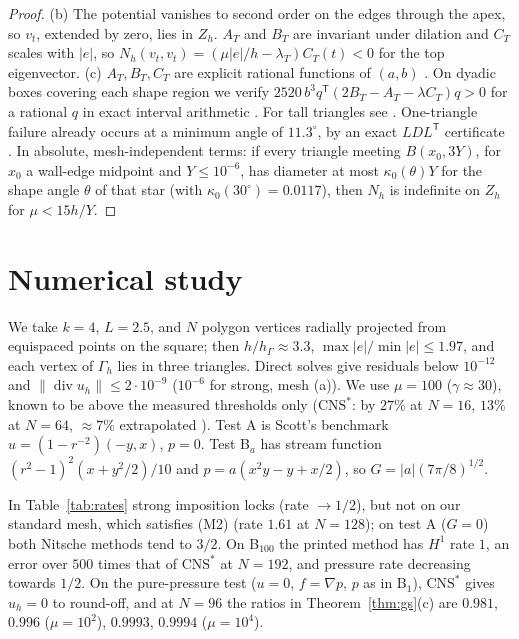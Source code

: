\documentclass[5p,times]{elsarticle}
\theoremstyle{definition}
\newcommand{\hG}{h_\Gamma}
\newcommand{\Gh}{\Gamma_h}
\newcommand{\Zh}{Z_h}
\newcommand{\norm}[1]{\lVert #1\rVert}
\newcommand{\CNS}{\mathrm{CNS}^\ast}
\renewcommand{\div}{\operatorname{div}}
\newcommand{\ext}[1]{\cite[#1]{PadhiExt}}
\begin{document}
\begin{proof}
(b) The potential vanishes to second order on the edges through the apex, so $v_t$, extended by zero, lies in $\Zh$. $A_T$ and $B_T$ are invariant under dilation and $C_T$ scales with $|e|$, so $N_h(v_t,v_t)=(\mu|e|/h-\lambda_T)C_T(t)<0$ for the top eigenvector. (c) $A_T,B_T,C_T$ are explicit rational functions of $(a,b)$ \ext{\S10.1}. On dyadic boxes covering each shape region we verify $2520\,b^3q^{\mathsf T}(2B_T-A_T-\lambda C_T)q>0$ for a rational $q$ in exact interval arithmetic \ext{Prop.~10.3}. For tall triangles see \ext{Prop.~10.6, Thm.~10.13}. One-triangle failure already occurs at a minimum angle of $11.3^\circ$, by an exact $LDL^{\mathsf T}$ certificate \ext{\S10.1}. In absolute, mesh-independent terms: if every triangle meeting $B(x_0,3Y)$, for $x_0$ a wall-edge midpoint and $Y\le10^{-6}$, has diameter at most $\kappa_0(\theta)Y$ for the shape angle $\theta$ of that star (with $\kappa_0(30^\circ)=0.0117$), then $N_h$ is indefinite on $\Zh$ for $\mu<15h/Y$.
\end{proof}

\section{Numerical study}\label{sec:num}

We take $k=4$, $L=2.5$, and $N$ polygon vertices radially projected from equispaced points on the square; then $h/\hG\approx3.3$, $\max|e|/\min|e|\le1.97$, and each vertex of $\Gh$ lies in three triangles. Direct solves give residuals below $10^{-12}$ and $\norm{\div u_h}\le2\cdot10^{-9}$ ($10^{-6}$ for strong, mesh (a)). We use $\mu=100$ ($\gamma\approx30$), known to be above the measured thresholds only ($\CNS$: by $27\%$ at $N=16$, $13\%$ at $N=64$, ${\approx}7\%$ extrapolated \ext{Rem.~15.18}). Test A is Scott's benchmark $u=(1-r^{-2})(-y,x)$, $p=0$. Test B$_a$ has stream function $(r^2-1)^2(x+y^2/2)/10$ and $p=a(x^2y-y+x/2)$, so $G=|a|(7\pi/8)^{1/2}$.


In Table~\ref{tab:rates} strong imposition locks (rate $\to1/2$), but not on our standard mesh, which satisfies (M2) (rate $1.61$ at $N=128$); on test A ($G=0$) both Nitsche methods tend to $3/2$. On B$_{100}$ the printed method has $H^1$ rate $1$, an error over $500$ times that of $\CNS$ at $N=192$, and pressure rate decreasing towards $1/2$. On the pure-pressure test ($u=0$, $f=\nabla p$, $p$ as in B$_1$), $\CNS$ gives $u_h=0$ to round-off, and at $N=96$ the ratios in Theorem~\ref{thm:gs}(c) are $0.981$, $0.996$ ($\mu=10^2$), $0.9993$, $0.9994$ ($\mu=10^4$).
\end{document}
